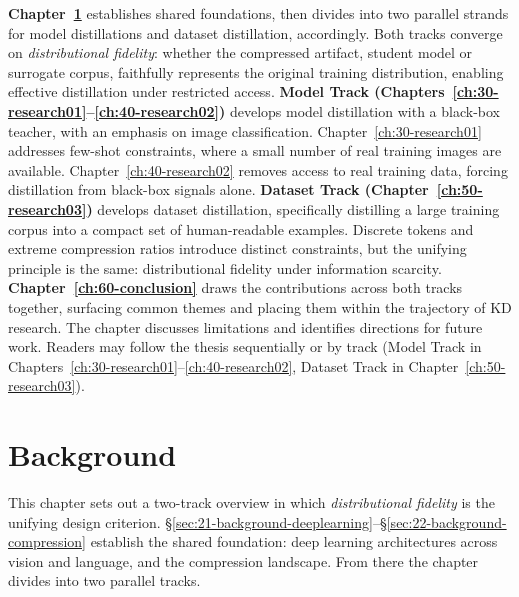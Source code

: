 \documentclass[12pt, a4paper, twoside]{book}
\numberwithin{equation}{chapter}
\theoremstyle{plain}
\theoremstyle{definition}
\theoremstyle{remark}
\newenvironment{foldable}{}{}
\begin{document}
\begin{foldable}
  \textbf{Chapter~\ref{ch:20-background}} establishes shared foundations, then divides into two parallel strands for model distillations and dataset distillation, accordingly.
  Both tracks converge on \textit{distributional fidelity}: whether the compressed artifact, student model or surrogate corpus, faithfully represents the original training distribution, enabling effective distillation under restricted access.
  \textbf{Model Track (Chapters~\ref{ch:30-research01}--\ref{ch:40-research02})} develops model distillation with a black-box teacher, with an emphasis on image classification.
  Chapter~\ref{ch:30-research01} addresses few-shot constraints, where a small number of real training images are available.
  Chapter~\ref{ch:40-research02} removes access to real training data, forcing distillation from black-box signals alone.
  \textbf{Dataset Track (Chapter~\ref{ch:50-research03})} develops dataset distillation, specifically distilling a large training corpus into a compact set of human-readable examples.
  Discrete tokens and extreme compression ratios introduce distinct constraints, but the unifying principle is the same: distributional fidelity under information scarcity.
  \textbf{Chapter~\ref{ch:60-conclusion}} draws the contributions across both tracks together, surfacing common themes and placing them within the trajectory of \ac{KD} research.
  The chapter discusses limitations and identifies directions for future work.
  Readers may follow the thesis sequentially or by track (Model Track in Chapters~\ref{ch:30-research01}--\ref{ch:40-research02}, Dataset Track in Chapter~\ref{ch:50-research03}).
\end{foldable}
 \clearpage{}
\clearpage{}\acresetall

\chapter{Background} \label{ch:20-background}

\begin{foldable}
  This chapter sets out a two-track overview in which \textit{distributional fidelity} is the unifying design criterion.
  \S\ref{sec:21-background-deeplearning}--\S\ref{sec:22-background-compression} establish the shared foundation: deep learning architectures across vision and language, and the compression landscape.
  From there the chapter divides into two parallel tracks.
\end{foldable}
\end{document}
